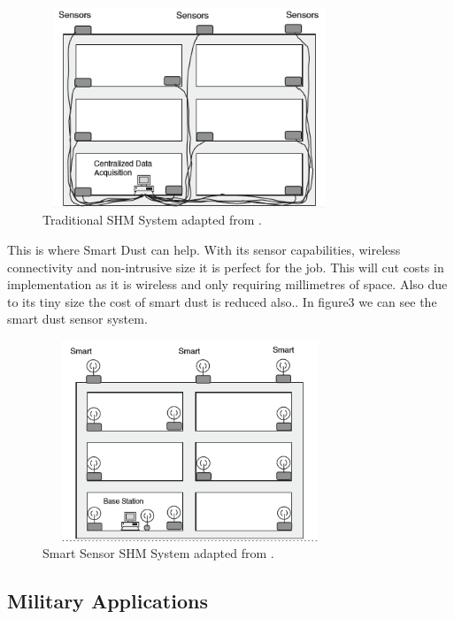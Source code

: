 \documentclass[article]{IEEEtran}
\begin{document}
\begin{figure}[h!]
\graphicspath{ {images/} }
\includegraphics[width=8.8cm, height=6cm]{figure2}
\caption{Traditional SHM System adapted from \cite{SHM}.}
\label{Tradition SHM}
\end{figure}

This is where Smart Dust can help. With its sensor capabilities, wireless connectivity and non-intrusive size it is perfect for the job. This will cut costs in implementation as it is wireless and only requiring millimetres of space. Also due to its tiny size the cost of smart dust is reduced also.\cite{SHM}. In figure3 we can see the smart dust sensor system.

\begin{figure}[h!]
\graphicspath{ {images/} }
\includegraphics[width=8.8cm, height=6cm]{figure3}
\caption{Smart Sensor SHM System adapted from \cite{SHM}.}
\end{figure}

\subsection{Military Applications}
\end{document}
